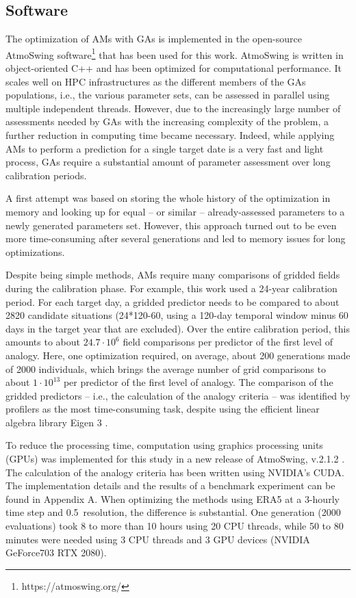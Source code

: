 \documentclass[draft]{agujournal2019}
\begin{document}
\subsection{Software}
\label{software}

The optimization of AMs with GAs is implemented in the open-source AtmoSwing software\footnote{https://atmoswing.org/} \cite{Horton2019} that has been used for this work. AtmoSwing is written in object-oriented C++ and has been optimized for computational performance. It scales well on HPC infrastructures as the different members of the GAs populations, i.e., the various parameter sets, can be assessed in parallel using multiple independent threads. However, due to the increasingly large number of assessments needed by GAs with the increasing complexity of the problem, a further reduction in computing time became necessary. Indeed, while applying AMs to perform a prediction for a single target date is a very fast and light process, GAs require a substantial amount of parameter assessment over long calibration periods.

A first attempt was based on storing the whole history of the optimization in memory and looking up for equal -- or similar -- already-assessed parameters to a newly generated parameters set. However, this approach turned out to be even more time-consuming after several generations and led to memory issues for long optimizations.

Despite being simple methods, AMs require many comparisons of gridded fields during the calibration phase. For example, this work used a 24-year calibration period. For each target day, a gridded predictor needs to be compared to about 2820 candidate situations (24*120-60, using a 120-day temporal window minus 60 days in the target year that are excluded). Over the entire calibration period, this amounts to about $24.7\cdot10^6$ field comparisons per predictor of the first level of analogy. Here, one optimization required, on average, about 200 generations made of 2000 individuals, which brings the average number of grid comparisons to about $1\cdot10^{13}$ per predictor of the first level of analogy. The comparison of the gridded predictors – i.e., the calculation of the analogy criteria -- was identified by profilers as the most time-consuming task, despite using the efficient linear algebra library Eigen 3 \cite{Guennebaud2010}.

To reduce the processing time, computation using graphics processing units (GPUs) was implemented for this study in a new release of AtmoSwing, v.2.1.2 \cite{Horton2019b}. The calculation of the analogy criteria has been written using NVIDIA's CUDA. The implementation details and the results of a benchmark experiment can be found in Appendix A. When optimizing the methods using ERA5 at a 3-hourly time step and 0.5\degree\ resolution, the difference is substantial. One generation (2000 evaluations) took 8 to more than 10 hours using 20 CPU threads, while 50 to 80 minutes were needed using 3 CPU threads and 3 GPU devices (NVIDIA GeForce703 RTX 2080).
\end{document}
